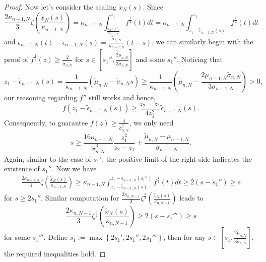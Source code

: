 \documentclass[11pt]{article}
\numberwithin{equation}{section}%
\numberwithin{theorem}{section}
\begin{document}
\begin{proof}
Now let's consider the scaling $\tilde{x}_N(s)$. Since
\begin{equation*}
    \frac{2\kappa_{n-1,N}}{3}\zeta\left(\frac{\tilde{x}_N(s)}{\kappa_{n-1,N}}\right)=\kappa_{n-1,N}\int_{\frac{\tilde{x}_N(s)}{\kappa_{n-1,N}}}^{z_1}f^\frac{1}{2}(t)dt=\kappa_{n-1,N}\int_{z_1-\tilde{\epsilon}_{n-1,N}(s)}^{z_1}f^\frac{1}{2}(t)dt
\end{equation*}
and $\tilde{\epsilon}_{n-1,N}(t)-\tilde{\epsilon}_{n-1,N}(s)=\frac{\tilde{\sigma}_{n,N}}{\kappa_{n-1,N}}(t-s)$, we can similarly begin with the proof of $f^\frac{1}{2}(z)\ge\frac{2}{\tilde{\sigma}_{n,N}}$ for $s\in\left[s_1'',\frac{\tilde{2\mu}_{n,N}}{3\tilde{\sigma}_{n,N}}\right]$ and some $s_1''$. Noticing that
\begin{equation*}
    z_1-\tilde{\epsilon}_{n-1,N}(s)=\frac{1}{\kappa_{n-1,N}}\left(\tilde{\mu}_{n,N}-\tilde{\sigma}_{n,N}s\right)\ge\frac{1}{\kappa_{n-1,N}}\left(\tilde{\mu}_{n,N}-\frac{2\mu_{n-1,N}\tilde{\sigma}_{n,N}}{3\sigma_{n-1,N}}\right)>0,
\end{equation*}
our reasoning regarding $f''$ still works and hence,
\begin{equation*}
    f\left(z_1-\tilde{\epsilon}_{n-1,N}(s)\right)\ge\frac{z_2-z_1}{4z_1^2}\tilde{\epsilon}_{n-1,N}(s).
\end{equation*}
Consequently, to guarantee $f(z)\ge\frac{4}{\tilde{\sigma}^2_{n,N}}$, we only need
\begin{equation*}
    s\ge\frac{16\kappa_{n-1,N}}{\tilde{\sigma}^3_{n,N}}\frac{z_1^2}{z_2-z_1}+\frac{\tilde{\mu}_{n,N}-\mu_{n-1,N}}{\sigma_{n-1,N}}.
\end{equation*}
Again, similar to the case of $s_1'$, the positive limit of the right side indicates the existence of $s_1''$. Now we have
\begin{equation*}
\begin{split}
       \frac{2\kappa_{n-1,N}}{3}\zeta\left(\frac{\tilde{x}_N(s)}{\kappa_{n-1,N}}\right)\ge\kappa_{n-1,N}\int_{z_1-\tilde{\epsilon}_{n-1,N}(s)}^{z_1-\tilde{\epsilon}_{n-1,N}(s_1'')}f^\frac{1}{2}(t)dt\ge2(s-s_1'')\ge s
\end{split}
\end{equation*}
for $s\ge 2s_1''$. Similar computation for $\frac{2\kappa_{n,N-1}}{3}\zeta^\frac{3}{2}\left(\frac{\tilde{x}_N(s)}{\kappa_{n,N-1}}\right)$ leads to 
\begin{equation*}
    \frac{2\kappa_{n,N-1}}{3}\zeta^\frac{3}{2}\left(\frac{\tilde{x}_N(s)}{\kappa_{n,N-1}}\right)\ge 2(s-s_1''')\ge s
\end{equation*}
for some $s_1'''$. Define $s_1:=\max\left\{2s_1',2s_1'',2s_1'''\right\}$, then for any $s\in\left[s_1,\frac{2\tilde{\mu}_{n,N}}{3\tilde{\sigma}_{n,N}}\right]$, the required inequalities hold.
\end{proof}
\end{document}
